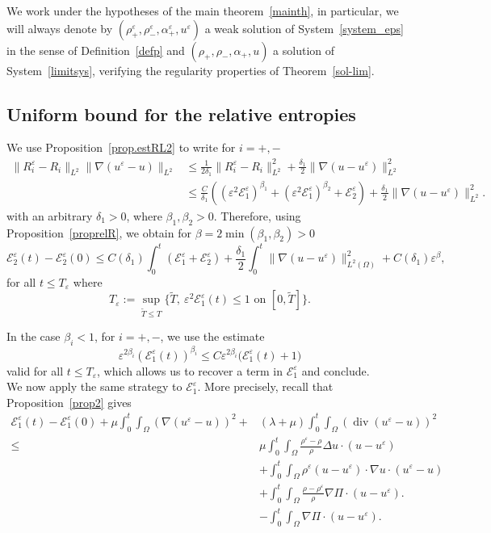 \documentclass[11pt, twoside, a4paper]{article}
\theoremstyle{plain}
\theoremstyle{remark}
\numberwithin{equation}{section}
\def\EE{{\mathcal E}}
\renewcommand{\div}{\operatorname{div}}
\renewcommand{\leq}{\leqslant}\renewcommand{\le}{\leqslant}
\renewcommand{\epsilon}{\varepsilon}
\newcommand{\eps}{\varepsilon}
\begin{document}
We work under the hypotheses of the main theorem~\ref{mainth}, in particular, we will always denote by $(\rho^{\epsilon}_+,\rho^{\epsilon}_-,\alpha^{\epsilon}_+,u^{\epsilon})$ a weak solution of System~\eqref{system_eps} in the sense of Definition~\ref{defp} and $(\rho_+,\rho_-,\alpha_+,u)$ a solution of System~\eqref{limitsys}, verifying the regularity properties of Theorem~\ref{sol-lim}.



\subsection{Uniform bound for the relative entropies}\label{sect4.1}


We use Proposition~\ref{prop.estRL2} to write for $i=+,-$
\begin{align*}
 \| R_i^\eps - R_i\|_{L^2} \| \nabla (u^\eps -u)\|_{L^2} &\leq \frac{1}{2\delta_1} \| R_i^\eps - R_i \|_{L^2}^2 + \frac{\delta_1}{2} \lVert \nabla (u-u^\eps) \rVert_{L^2}^2 \\
 &\leq \frac{C}{\delta_1}\left( (\eps^2 \EE^\eps_1)^{\beta_1}+(\eps^2 \EE^\eps_1)^{\beta_2} +\EE_2^\eps \right) + \frac{\delta_1}{2} \lVert \nabla ( u-u^\eps) \rVert_{L^2}^2.
\end{align*}
with an arbitrary $\delta_1>0$, where $\beta_1, \beta_2>0$.
Therefore, using Proposition~\ref{proprelR}, we obtain for $\beta=2\min(\beta_1,\beta_2)>0$
\begin{equation}
 \label{dtE2}
 \EE^\eps_{2}(t) - \EE^\eps_{2}(0) \leq C(\delta_1) \int_0^t (\EE^\eps_1 +\EE^\eps_{2})
 + \frac{\delta_1}{2} \int_0^t \lVert \nabla ( u-u^\eps) \rVert_{L^2(\Omega)}^2 + C(\delta_1)\eps^\beta,
\end{equation}
for all $t\leq T_\eps$ where 
\[
T_\eps:=\sup_{\tilde T \leq T}\{\tilde T , \ \eps^2\EE^\eps_1(t)\leq 1 \text{ on }[0,\tilde T]\}.
\]

In the case $\beta_i<1$, for $i=+,-$, we use the estimate 
\[
\eps^{2\beta_i} (\EE^\eps_1(t))^{\beta_i} \leq C \eps^{2\beta_i} \big(\EE^\eps_1(t)+1\big)
\]
valid for all $t\leq T_\eps$, which allows us to recover a term in $\EE_1^\eps$ and conclude.\\

We now apply the same strategy to $\EE^\eps_1$. More precisely, recall that Proposition~\ref{prop2} gives
\begin{align}
 \EE^\eps_1(t) - \EE^\eps_1(0) + \mu \int_0^t\!\!\! \int_{\Omega} \left( \nabla (u^{\epsilon}-u) \right)^2 +& (\lambda+\mu) \int_0^t\!\!\! \int_{\Omega} \left( \div (u^{\epsilon}-u) \right)^2 \nonumber\\
 \leq& \mu \int_0^t\!\!\! \int_\Omega \frac{\rho^\eps - \rho}{\rho} \Delta u\cdot (u-u^\eps) \label{estim1} \\
 &+ \int_0^t\!\!\! \int_{\Omega} \rho^\eps (u-u^\eps) \cdot \nabla u \cdot (u^\eps-u) \label{estim2} \\
 &+ \int_0^t\!\!\! \int_{\Omega} \frac{\rho-\rho^\eps}{\rho} \nabla \Pi \cdot (u-u^\eps). \label{estim3}\\
 &- \int_0^t\!\!\! \int_{\Omega} \nabla \Pi \cdot (u-u^\eps). \label{estim4}
\end{align}
\end{document}
